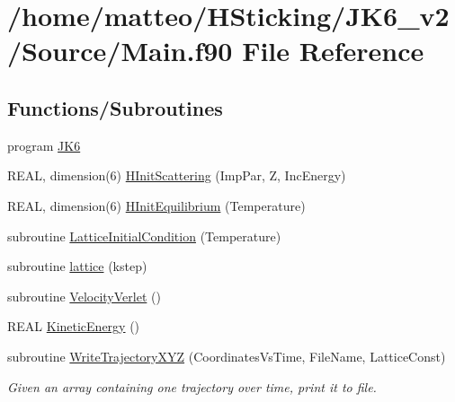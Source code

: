 \hypertarget{_main_8f90}{
\section{/home/matteo/HSticking/JK6\_\-v2/Source/Main.f90 File Reference}
\label{_main_8f90}
}
\subsection*{Functions/Subroutines}
\begin{DoxyCompactItemize}
\item 
program \hyperlink{_main_8f90_a7234142162bdb9b2e94af0202102fa71}{JK6}
\item 
REAL, dimension(6) \hyperlink{_main_8f90_a9bf5d0b0b36e79732b8d6cc3787194f3}{HInitScattering} (ImpPar, Z, IncEnergy)
\item 
REAL, dimension(6) \hyperlink{_main_8f90_a35604374e5cff380321c1eb4d5a7170d}{HInitEquilibrium} (Temperature)
\item 
subroutine \hyperlink{_main_8f90_aae431a18d6b2c93e480cf3119865a6ce}{LatticeInitialCondition} (Temperature)
\item 
subroutine \hyperlink{_main_8f90_ae10c016023dc8faa80bff5390d4723be}{lattice} (kstep)
\item 
subroutine \hyperlink{_main_8f90_acbd07b94fa51be5f41afe3c399158cd2}{VelocityVerlet} ()
\item 
REAL \hyperlink{_main_8f90_a407e632afbbd3f7708e2fd6ee89648cc}{KineticEnergy} ()
\item 
subroutine \hyperlink{_main_8f90_ad150b813c0174181d843297d3c2ae940}{WriteTrajectoryXYZ} (CoordinatesVsTime, FileName, LatticeConst)
\begin{DoxyCompactList}\small\item\em Given an array containing one trajectory over time, print it to file. \item\end{DoxyCompactList}\end{DoxyCompactItemize}


